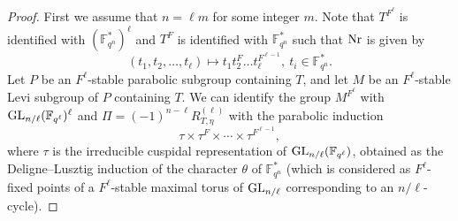 \documentclass[10pt, reqno]{amsart}
\theoremstyle{plain}
\numberwithin{equation}{section} \newcommand{\di}{\operatorname{dim}}
\begin{document}
\begin{proof}
First we assume that $n=\ell m$ for some integer $m$.
Note that $T^{F^\ell}$ is identified with
$(\mathbb{F}_{q^n}^\ast)^\ell$ and $T^F$ is identified with
$\mathbb{F}_{q^n}^\ast$ such that ${\rm Nr}$ is given by
$$(t_1, t_2,\dots, t_\ell)\mapsto t_1t_2^F
\dots t_\ell^{F^{\ell-1}},\ t_i\in \mathbb{F}_{q^n}^\ast.$$
Let $P$ be an $F^\ell$-stable parabolic subgroup containing $T$, and
let $M$ be an $F^\ell$-stable Levi subgroup of $P$ containing $T$.  We
can identify the group $M^{F^\ell}$ with
${\rm GL}_{n/\ell}(\mathbb{F}_{q^\ell})^\ell$ and
$\Pi=(-1)^{n-\ell}R^{(\ell)}_{T, \eta}$ with the parabolic induction
$$\tau\times\tau^{F}\times\cdots\times\tau^{F^{\ell-1}},$$
where $\tau$ is the irreducible cuspidal representation of 
${\rm GL}_{n/\ell}(\mathbb{F}_{q^\ell})$, obtained as
the Deligne--Lusztig induction of the character 
$\theta$ of $\mathbb{F}_{q^n}^\ast$ (which is 
considered as $F^{\ell}$-fixed points of 
a $F^\ell$-stable maximal torus of ${\rm GL}_{n/\ell}$
corresponding to an $n/\ell$-cycle). 



\end{proof}
\end{document}
